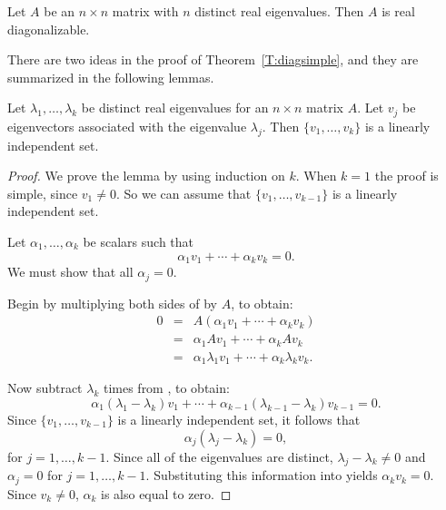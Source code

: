 \documentclass{ximera}
\begin{document}
\begin{theorem}  \label{T:diagsimple}
Let $A$ be an $n\times n$ matrix with $n$ distinct real
eigenvalues.  
Then $A$ is real diagonalizable.
\end{theorem}  

There are two ideas in the proof of Theorem~\ref{T:diagsimple}, and 
they are summarized in the following lemmas.

\begin{lemma} \label{L:simpleeigen}
Let $\lambda_1,\ldots,\lambda_k$ be distinct real eigenvalues
for an $n\times n$ matrix $A$.  Let $v_j$ be eigenvectors
associated with the eigenvalue $\lambda_j$.  Then
$\{v_1,\ldots,v_k\}$ is a linearly independent set.
\end {lemma} 

\begin{proof} We prove the lemma by using induction on $k$.  When $k=1$
the proof is simple, since $v_1\neq 0$.  So we can assume that
$\{v_1,\ldots,v_{k-1}\}$ is a linearly independent set. 

Let $\alpha_1,\ldots,\alpha_k$ be scalars such that
\begin{equation}  \label{e:linindep}
\alpha_1 v_1 + \cdots + \alpha_k v_k = 0.
\end{equation}
We must show that all $\alpha_j=0$.

Begin by multiplying both sides of  by $A$, to
obtain: 
\begin{eqnarray}
0 & = & A(\alpha_1 v_1 + \cdots + \alpha_k v_k) \nonumber \\
& = & \alpha_1 Av_1 + \cdots + \alpha_k Av_k \label{e:linother}\\
& = & \alpha_1 \lambda_1 v_1 + \cdots + \alpha_k \lambda_k v_k.\nonumber
\end{eqnarray}

Now subtract $\lambda_k$ times  from ,
to obtain:
\[
\alpha_1(\lambda_1-\lambda_k)v_1 + \cdots +
\alpha_{k-1}(\lambda_{k-1}-\lambda_k)v_{k-1} = 0.
\]
Since $\{v_1,\ldots,v_{k-1}\}$ is a linearly independent set, it
follows that 
\[
\alpha_j(\lambda_j-\lambda_k)=0,
\]
for $j=1,\ldots,k-1$.  Since all of the eigenvalues are
distinct, $\lambda_j-\lambda_k\neq 0$ and $\alpha_j=0$ for
$j=1,\ldots,k-1$. Substituting this information into
 yields $\alpha_k v_k=0$.  Since $v_k\neq 0$, 
$\alpha_k$ is also equal to zero.  \end{proof}
\end{document}
